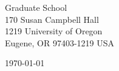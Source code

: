 \begin{minipage}{0.49\textwidth}
\begin{flushleft}
  \noindent
  Graduate School\\
170 Susan Campbell Hall\\
1219 University of Oregon\\
Eugene, OR 97403-1219 USA
\end{flushleft}
\end{minipage}
\begin{minipage}{0.47\textwidth}
\begin{flushright}
\today
\end{flushright}
\end{minipage} \\

\newcommand{\univ}{University of Oregon}
\newcommand{\univshort}{Oregon}
\newcommand{\degree}{M.Sc.}
\newcommand{\dept}{Computer Science}
